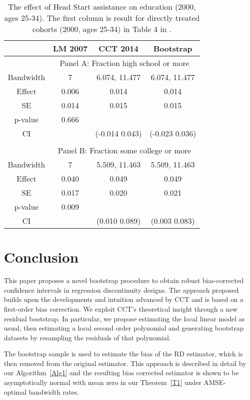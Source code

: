 \documentclass[12pt,fleqn]{article}
\begin{document}
\begin{table}[ht]
	\centering
	\begin{tabular}{cccc}
		\toprule
		& LM 2007 & CCT 2014 & Bootstrap \\
		\midrule
		& \multicolumn{3}{c}{Panel A: Fraction high school or more} \\
		Bandwidth & 7 & 6.074, 11.477 & 6.074, 11.477 \\
		Effect    & 0.006 & 0.014 & 0.014 \\
		SE        & 0.014 & 0.015 & 0.015 \\
		p-value   & 0.666 & & \\
		CI        & & (-0.014 0.043) & (-0.023 0.036) \\

		&&& \\
		& \multicolumn{3}{c}{Panel B: Fraction some college or more} \\
		Bandwidth & 7 & 5.509, 11.463 & 5.509, 11.463 \\
		Effect    & 0.040 & 0.049 & 0.049 \\
		SE        & 0.017 & 0.020 & 0.021 \\
		p-value   & 0.009 & & \\
		CI        & & (0.010 0.089) & (0.003 0.083) \\
		\bottomrule
	\end{tabular}
	\caption{The effect of Head Start assistance on education (2000, ages 25-34). The first column is result for directly treated cohorts (2000, ages 25-34) in Table 4 in \cite{ludwig2007}.}
	\label{tab: education 2000 ages 25-34}
\end{table}

\section{Conclusion}\label{conclusion}
This paper proposes a novel bootstrap procedure to obtain robust bias-corrected confidence intervals in regression discontinuity designs.
The approach proposed builds upon the developments and intuition advanced by CCT and is based on a first-order bias correction.
 We exploit CCT's theoretical insight through a new residual bootstrap. In particular, we propose estimating the local linear model as usual,
then estimating a local second order polynomial and generating bootstrap datasets by resampling the residuals of that polynomial.

The bootstrap sample is used to estimate the bias of the RD estimator, which is then removed from the original estimator.
 This approach is described in detail by our Algorithm~\ref{Alg1} and the resulting bias corrected estimator is shown to be asymptotically normal with mean zero in our
Theorem~\ref{T1} under AMSE-optimal bandwidth rates.
\end{document}
